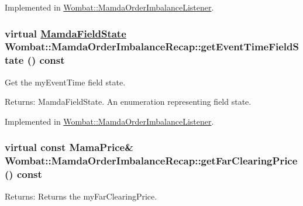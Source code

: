 Implemented in \hyperlink{classWombat_1_1MamdaOrderImbalanceListener_6cac146703cca68aecfd579f512d8b99}{Wombat::Mamda\-Order\-Imbalance\-Listener}.\hypertarget{classWombat_1_1MamdaOrderImbalanceRecap_5a99f2d259050eb8aa9e014ff7bb69de}{
\subsubsection[getEventTimeFieldState]{\setlength{\rightskip}{0pt plus 5cm}virtual \hyperlink{namespaceWombat_93aac974f2ab713554fd12a1fa3b7d2a}{Mamda\-Field\-State} Wombat::Mamda\-Order\-Imbalance\-Recap::get\-Event\-Time\-Field\-State () const}}
\label{classWombat_1_1MamdaOrderImbalanceRecap_5a99f2d259050eb8aa9e014ff7bb69de}


Get the my\-Event\-Time field state. 

\begin{Desc}
\item[Returns:]Mamda\-Field\-State. An enumeration representing field state. \end{Desc}


Implemented in \hyperlink{classWombat_1_1MamdaOrderImbalanceListener_b9da1457422c7e005b4d1cb097621e01}{Wombat::Mamda\-Order\-Imbalance\-Listener}.\hypertarget{classWombat_1_1MamdaOrderImbalanceRecap_0ca93b87f7f9e0dcf21db29dfced88f7}{
\subsubsection[getFarClearingPrice]{\setlength{\rightskip}{0pt plus 5cm}virtual const Mama\-Price\& Wombat::Mamda\-Order\-Imbalance\-Recap::get\-Far\-Clearing\-Price () const}}
\label{classWombat_1_1MamdaOrderImbalanceRecap_0ca93b87f7f9e0dcf21db29dfced88f7}


\begin{Desc}
\item[Returns:]Returns the my\-Far\-Clearing\-Price. \end{Desc}


